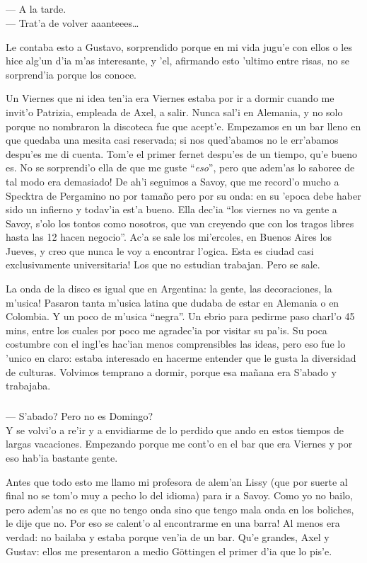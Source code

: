 \subparagraph{}\label{ssub:cuandoVolves} --- A la tarde.\\ --- Trat'a de volver
aaanteees\ldots\\ \hangindent=1cm

Le contaba esto a Gustavo, sorprendido porque en mi vida jugu'e con ellos o les
hice alg'un d'ia m'as interesante, y 'el, afirmando esto 'ultimo entre risas,
no se sorprend'ia porque los conoce.

Un Viernes que ni idea ten'ia era Viernes estaba por ir a dormir cuando me
invit'o Patrizia, empleada de Axel, a salir. Nunca sal'i en Alemania, y no solo
porque no nombraron la discoteca fue que acept'e. Empezamos en un bar lleno en
que quedaba una mesita casi reservada; si nos qued'abamos no le err'abamos
despu'es me di cuenta. Tom'e el primer fernet despu'es de un tiempo, qu'e bueno
es. No se sorprendi'o ella de que me guste ``{\sl eso}'', \textexclamdown pero
que adem'as lo saboree de tal modo era demasiado! De ah'i seguimos a Savoy, que
me record'o mucho a Specktra de Pergamino no por tama\~no pero por su onda: en
su 'epoca debe haber sido un infierno y todav'ia est'a bueno. Ella dec'ia ``los
viernes no va gente a Savoy, s'olo los tontos como nosotros, que van creyendo
que con los tragos libres hasta las 12 hacen negocio''. Ac'a se sale los
mi'ercoles, en Buenos Aires los Jueves, y creo que nunca le voy a encontrar
l'ogica. \textexclamdown Esta es ciudad casi exclusivamente universitaria! Los
que no estudian trabajan. Pero se sale.

La onda de la disco es igual que en Argentina: la gente, las decoraciones,
\textexclamdown la m'usica! Pasaron tanta m'usica latina que dudaba de estar en
Alemania o en Colombia. Y un poco de m'usica ``negra''. Un ebrio para pedirme
paso charl'o 45 mins, entre los cuales por poco me agradec'ia por visitar su
pa'is. Su poca costumbre con el ingl'es hac'ian menos comprensibles las ideas,
pero eso fue lo 'unico en claro: estaba interesado en hacerme entender que le
gusta la diversidad de culturas. Volvimos temprano a dormir, porque esa ma\~nana
era S'abado y trabajaba.

\subparagraph{}\label{ssub:hoyesSabado} --- \textquestiondown S'abado?
\textquestiondown Pero no es Domingo?\\

Y se volvi'o a re'ir y a envidiarme de lo perdido que ando en estos tiempos de
largas vacaciones. Empezando porque me cont'o en el bar que era Viernes y por
eso hab'ia bastante gente.

Antes que todo esto me llamo mi profesora de alem'an Lissy (que por suerte al
final no se tom'o muy a pecho lo del idioma) para ir a Savoy. Como yo no bailo,
pero adem'as no es que no tengo onda sino que tengo mala onda en los boliches,
le dije que no. \textexclamdown Por eso se calent'o al encontrarme en una barra!
Al menos era verdad: no bailaba y estaba porque ven'ia de un bar. Qu'e grandes,
Axel y Gustav: ellos me presentaron a medio G\"ottingen el primer d'ia que lo
pis'e.\\

